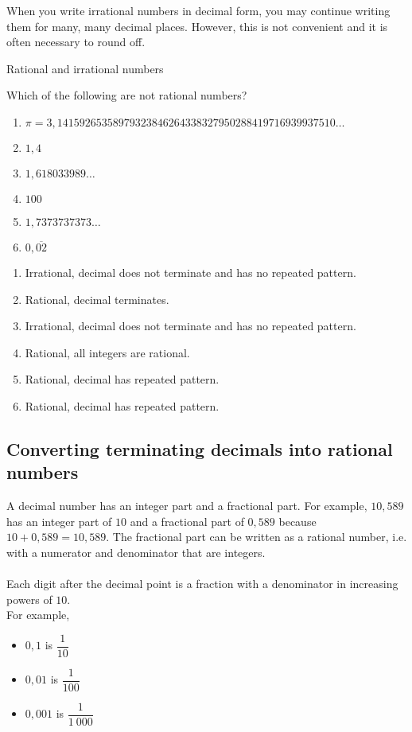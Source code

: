 \par
When you write irrational numbers in decimal form, you may continue writing them for many, many
decimal places. However, this is not convenient and it is often necessary to round off.


\begin{wex}{Rational and irrational numbers}
{
\begin{minipage}{\textwidth}
Which of the following are not rational numbers?\\

\begin{enumerate}[itemsep=5pt, label=\textbf{\arabic*}. ] 
\item $\pi =3,14159265358979323846264338327950288419716939937510\ldots$
\item $1,4$
\item $1,618033989\ldots$
\item $100$
\item $1,7373737373\ldots$
\item $0,\overline{02}$
\end{enumerate}
\end{minipage}
}
{
\begin{minipage}{\textwidth}
\begin{enumerate}[itemsep=5pt, label=\textbf{\arabic*}. ] 
\item Irrational, decimal does not terminate and has no repeated pattern. 
\item Rational, decimal terminates.
\item Irrational, decimal does not terminate and has no repeated pattern. 
\item Rational, all integers are rational.
\item Rational, decimal has repeated pattern.
\item Rational, decimal has repeated pattern.
\end{enumerate}
\end{minipage}
}
\end{wex}

\subsection{Converting terminating decimals into rational numbers}

A decimal number has an integer part and a fractional part. For example, $10,589$ has an integer part of $10$ and a fractional part of $0,589$ because $10+0,589=10,589$. The fractional part can be written as a rational number, i.e.\@{} with a numerator and denominator that are integers. \\
\\
Each digit after the decimal point is a fraction with a denominator in increasing powers of $10$.\\ For example,
\begin{itemize}
\item $0,1$ is $\dfrac{1}{10}$
\item $0,01$ is $\dfrac{1}{100}$
\item $0,001$ is $\dfrac{1}{1~000}$
\end{itemize}

